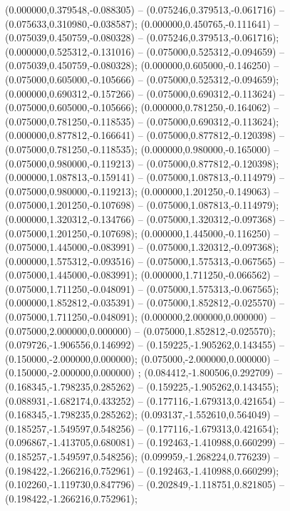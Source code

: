  (0.000000,0.379548,-0.088305) -- (0.075246,0.379513,-0.061716) -- (0.075633,0.310980,-0.038587);
 (0.000000,0.450765,-0.111641) -- (0.075039,0.450759,-0.080328) -- (0.075246,0.379513,-0.061716);
 (0.000000,0.525312,-0.131016) -- (0.075000,0.525312,-0.094659) -- (0.075039,0.450759,-0.080328);
 (0.000000,0.605000,-0.146250) -- (0.075000,0.605000,-0.105666) -- (0.075000,0.525312,-0.094659);
 (0.000000,0.690312,-0.157266) -- (0.075000,0.690312,-0.113624) -- (0.075000,0.605000,-0.105666);
 (0.000000,0.781250,-0.164062) -- (0.075000,0.781250,-0.118535) -- (0.075000,0.690312,-0.113624);
 (0.000000,0.877812,-0.166641) -- (0.075000,0.877812,-0.120398) -- (0.075000,0.781250,-0.118535);
 (0.000000,0.980000,-0.165000) -- (0.075000,0.980000,-0.119213) -- (0.075000,0.877812,-0.120398);
 (0.000000,1.087813,-0.159141) -- (0.075000,1.087813,-0.114979) -- (0.075000,0.980000,-0.119213);
 (0.000000,1.201250,-0.149063) -- (0.075000,1.201250,-0.107698) -- (0.075000,1.087813,-0.114979);
 (0.000000,1.320312,-0.134766) -- (0.075000,1.320312,-0.097368) -- (0.075000,1.201250,-0.107698);
 (0.000000,1.445000,-0.116250) -- (0.075000,1.445000,-0.083991) -- (0.075000,1.320312,-0.097368);
 (0.000000,1.575312,-0.093516) -- (0.075000,1.575313,-0.067565) -- (0.075000,1.445000,-0.083991);
 (0.000000,1.711250,-0.066562) -- (0.075000,1.711250,-0.048091) -- (0.075000,1.575313,-0.067565);
 (0.000000,1.852812,-0.035391) -- (0.075000,1.852812,-0.025570) -- (0.075000,1.711250,-0.048091);
 (0.000000,2.000000,0.000000) -- (0.075000,2.000000,0.000000) -- (0.075000,1.852812,-0.025570);
 (0.079726,-1.906556,0.146992) -- (0.159225,-1.905262,0.143455) -- (0.150000,-2.000000,0.000000);
 (0.075000,-2.000000,0.000000) -- (0.150000,-2.000000,0.000000) ;
 (0.084412,-1.800506,0.292709) -- (0.168345,-1.798235,0.285262) -- (0.159225,-1.905262,0.143455);
 (0.088931,-1.682174,0.433252) -- (0.177116,-1.679313,0.421654) -- (0.168345,-1.798235,0.285262);
 (0.093137,-1.552610,0.564049) -- (0.185257,-1.549597,0.548256) -- (0.177116,-1.679313,0.421654);
 (0.096867,-1.413705,0.680081) -- (0.192463,-1.410988,0.660299) -- (0.185257,-1.549597,0.548256);
 (0.099959,-1.268224,0.776239) -- (0.198422,-1.266216,0.752961) -- (0.192463,-1.410988,0.660299);
 (0.102260,-1.119730,0.847796) -- (0.202849,-1.118751,0.821805) -- (0.198422,-1.266216,0.752961);

